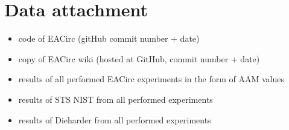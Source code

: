 \documentclass[12pt,oneside]{fithesis2}		%
\renewcommand{\_}{\leavevmode \kern0.0em\vbox{\hrule width0.4em}}
\newcommand{\squarebullet}{\textcolor{black}{\raisebox{0.15em}{\rule{4pt}{4pt}}}}
\newenvironment{myItemize}{
  \begin{itemize}[leftmargin=2em,rightmargin=1em,itemsep=\parskip ,parsep=0em,topsep=0em,partopsep=0em]
  \renewcommand{\labelitemi}{\squarebullet}
  \renewcommand{\labelitemii}{$\diamond$}
}{
  \end{itemize}
}
\begin{document}
\chapter{Data attachment}

\begin{myItemize}
\item code of EACirc (gitHub commit number + date)
\item copy of EACirc wiki (hosted at GitHub, commit number + date)
\item results of all performed EACirc experiments in the form of AAM values
\item results of STS NIST from all performed experiments
\item results of Dieharder from all performed experiments
\end{myItemize}
\end{document}
